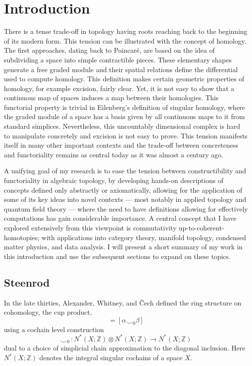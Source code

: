 
\section{Introduction} \label{s:introduction}

There is a tense trade-off in topology having roots reaching back to the beginning of its modern form. This tension can be illustrated with the concept of homology. The first approaches, dating back to Poincar\'e, are based on the idea of subdividing a space into simple contractible pieces. These elementary shapes generate a free graded module and their spatial relations define the differential used to compute homology. This definition makes certain geometric properties of homology, for example excision, fairly clear. Yet, it is not easy to show that a continuous map of spaces induces a map between their homologies. This functorial property is trivial in Eilenberg's definition of singular homology, where the graded module of a space has a basis given by all continuous maps to it from standard simplices. Nevertheless, this uncountably dimensional complex is hard to manipulate concretely and excision is not easy to prove. This tension manifests itself in many other important contexts and the trade-off between concreteness and functoriality remains as central today as it was almost a century ago.

A unifying goal of my research is to ease the tension between constructibility and functoriality in algebraic topology, by developing hands-on descriptions of concepts defined only abstractly or axiomatically, allowing for the application of some of its key ideas into novel contexts — most notably in applied topology and quantum field theory — where the need to have definitions allowing for effectively computations has gain considerable importance. A central concept that I have explored extensively from this viewpoint is commutativity up-to-coherent-homotopies; with applications into category theory, manifold topology, condensed matter physics, and data analysis. I will present a short summary of my work in this introduction and use the subsequent sections to expand on these topics.

\subsection{Steenrod}
In the late thirties, Alexander, Whitney, and \v{C}ech defined the ring structure on cohomology, the cup product,
\begin{equation*}
[\alpha] [\beta] = [\alpha \smallsmile_{0} \beta]
\end{equation*}
using a cochain level construction
\begin{equation*}
\smallsmile_0 \, : N^*(X; \mathbb Z) \otimes N^*(X; \mathbb Z) \to N^*(X; \mathbb Z)
\end{equation*}
dual to a choice of simplicial chain approximation to the diagonal inclusion. Here $N^*(X; \mathbb Z)$ denotes the integral singular cochains of a space $X$.

